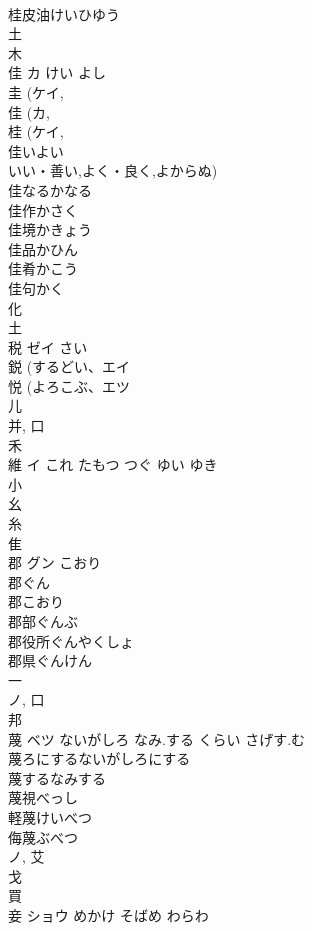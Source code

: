 \documentclass[8pt]{extreport}
\begin{document}
\begin{CJK}{UTF8}{min}
\\	桂皮油けいひゆう 
\\	土 
\\	木 
\\	佳	カ	けい よし	
\\	圭 (ケイ, 
\\	佳 (カ, 
\\	桂 (ケイ, 
\\	佳いよい
\\	いい・善い,よく・良く,よからぬ) 
\\	佳なるかなる
\\	佳作かさく
\\	佳境かきょう
\\	佳品かひん
\\	佳肴かこう
\\	佳句かく
\\	化 
\\	土 
\\	税	ゼイ	さい	
\\	鋭 (するどい、エイ 
\\	悦 (よろこぶ、エツ 
\\	儿 
\\	并, 口 
\\	禾 
\\	維	イ	これ たもつ つぐ ゆい ゆき	
\\	小 
\\	幺 
\\	糸 
\\	隹 
\\	郡	グン	こおり	
\\	郡ぐん 
\\	郡こおり 
\\	郡部ぐんぶ 
\\	郡役所ぐんやくしょ 
\\	郡県ぐんけん 
\\	一 
\\	ノ, 口 
\\	邦 
\\	蔑	ベツ	ないがしろ なみ.する くらい さげす.む	
\\	蔑ろにするないがしろにする
\\	蔑するなみする
\\	蔑視べっし
\\	軽蔑けいべつ
\\	侮蔑ぶべつ
\\	ノ, 艾 
\\	戈 
\\	買 
\\	妾	ショウ	めかけ そばめ わらわ	

\end{CJK}
\end{document}
